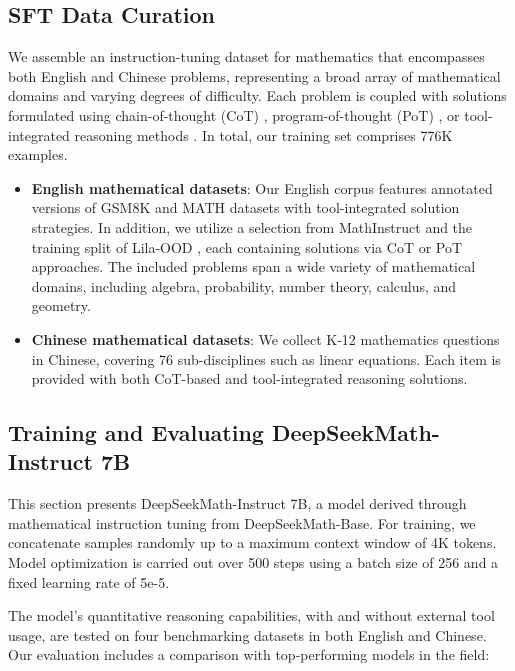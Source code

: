 \subsection{SFT Data Curation}

We assemble an instruction-tuning dataset for mathematics that encompasses both English and Chinese problems, representing a broad array of mathematical domains and varying degrees of difficulty. Each problem is coupled with solutions formulated using chain-of-thought (CoT) \citep{cot}, program-of-thought (PoT) \citep{pot,pal}, or tool-integrated reasoning methods \citep{tora}. In total, our training set comprises 776K examples.

\begin{itemize}[topsep=0pt]
    \item \textbf{English mathematical datasets}: Our English corpus features annotated versions of GSM8K and MATH datasets with tool-integrated solution strategies. In addition, we utilize a selection from MathInstruct \citep{MathInstruct} and the training split of Lila-OOD \citep{lila}, each containing solutions via CoT or PoT approaches. The included problems span a wide variety of mathematical domains, including algebra, probability, number theory, calculus, and geometry.
    \item \textbf{Chinese mathematical datasets}: We collect K-12 mathematics questions in Chinese, covering 76 sub-disciplines such as linear equations. Each item is provided with both CoT-based and tool-integrated reasoning solutions.
\end{itemize}

\subsection{Training and Evaluating DeepSeekMath-Instruct 7B}

This section presents DeepSeekMath-Instruct 7B, a model derived through mathematical instruction tuning from DeepSeekMath-Base. For training, we concatenate samples randomly up to a maximum context window of 4K tokens. Model optimization is carried out over 500 steps using a batch size of 256 and a fixed learning rate of 5e-5.

The model’s quantitative reasoning capabilities, with and without external tool usage, are tested on four benchmarking datasets in both English and Chinese. Our evaluation includes a comparison with top-performing models in the field:

